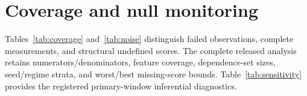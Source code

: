\documentclass[a4paper]{article}
\begin{document}
\section{Coverage and null monitoring}\label{app:coverage}
Tables~\ref{tab:coverage} and~\ref{tab:noise} distinguish failed observations, complete measurements, and structural undefined scores. The complete released analysis retains numerators/denominators, feature coverage, dependence-set sizes, seed/regime strata, and worst/best missing-score bounds. Table~\ref{tab:sensitivity} provides the registered primary-window inferential diagnostics.



\end{document}
